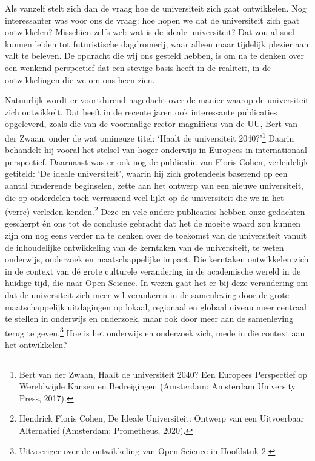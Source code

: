 \documentclass[empirical, authordate, ]{new-jote-article}
\begin{document}
	Als vanzelf stelt zich dan de vraag hoe de universiteit zich gaat ontwikkelen. Nog interessanter was voor ons de vraag: hoe hopen we dat de universiteit zich gaat ontwikkelen? Misschien zelfs wel: wat is de ideale universiteit? Dat zou al snel kunnen leiden tot futuristische dagdromerij, waar alleen maar tijdelijk plezier aan valt te beleven. De opdracht die wij ons gesteld hebben, is om na te denken over een wenkend perspectief dat een stevige basis heeft in de realiteit, in de ontwikkelingen die we om ons heen zien.







	Natuurlijk wordt er voortdurend nagedacht over de manier waarop de universiteit zich ontwikkelt. Dat heeft in de recente jaren ook interessante publicaties opgeleverd, zoals die van de voormalige rector magnificus van de UU, Bert van der Zwaan, onder de wat omineuze titel: ‘Haalt de universiteit 2040?'\footnote{Bert van der Zwaan, Haalt de universiteit 2040? Een Europees Perspectief op Wereldwijde Kansen en Bedreigingen (Amsterdam: Amsterdam University Press, 2017). } Daarin behandelt hij vooral het stelsel van hoger onderwijs in Europees in internationaal perspectief. Daarnaast was er ook nog de publicatie van Floris Cohen, verleidelijk getiteld: ‘De ideale universiteit', waarin hij zich grotendeels baserend op een aantal funderende beginselen, zette aan het ontwerp van een nieuwe universiteit, die op onderdelen toch verrassend veel lijkt op de universiteit die we in het (verre) verleden kenden.\footnote{Hendrick Floris Cohen, De Ideale Universiteit: Ontwerp van een Uitvoerbaar Alternatief (Amsterdam: Prometheus, 2020).} Deze en vele andere publicaties hebben onze gedachten gescherpt én ons tot de conclusie gebracht dat het de moeite waard zou kunnen zijn om nog eens verder na te denken over de toekomst van de universiteit vanuit de inhoudelijke ontwikkeling van de kerntaken van de universiteit, te weten onderwijs, onderzoek en maatschappelijke impact. Die kerntaken ontwikkelen zich in de context van dé grote culturele verandering in de academische wereld in de huidige tijd, die naar Open Science. In wezen gaat het er bij deze verandering om dat de universiteit zich meer wil verankeren in de samenleving door de grote maatschappelijk uitdagingen op lokaal, regionaal en globaal niveau meer centraal te stellen in onderwijs en onderzoek, maar ook door meer aan de samenleving terug te geven.\footnote{Uitvoeriger over de ontwikkeling van Open Science in Hoofdstuk 2.} Hoe is het onderwijs en onderzoek zich, mede in die context aan het ontwikkelen?
\end{document}
